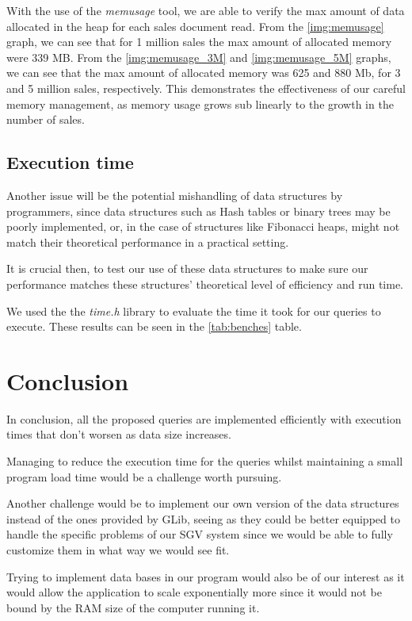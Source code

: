 \documentclass[a4paper]{report}
\begin{document}
With the use of the \textit{memusage} tool, we are able to verify the max amount of data allocated in the heap for each sales document read.
From the \ref{img:memusage} graph, we can see that for 1 million sales the max amount of allocated memory were 339 MB.
From the \ref{img:memusage_3M} and \ref{img:memusage_5M} graphs, we can see that the max amount of allocated memory was 625 and 880 Mb, for 3 and 5 million sales, respectively. This demonstrates the effectiveness of our careful memory management, as memory usage grows sub linearly to the growth in the number of sales.


\section{Execution time}

Another issue will be the potential mishandling of data structures by programmers, since data structures such as Hash tables or binary trees may be poorly implemented, or, in the case of structures like Fibonacci heaps, might not match their theoretical performance in a practical setting.

It is crucial then, to test our use of these data structures to make sure our performance matches these structures' theoretical level of efficiency and run time.

We used the the \textit{time.h} library to evaluate the time it took for our queries to execute. These results can be seen in the \ref{tab:benches} table.

\chapter{Conclusion}
In conclusion, all the proposed queries are implemented efficiently with execution times that don't  worsen as data size increases. 

Managing to reduce the execution time for the queries whilst maintaining a small program load time would be a challenge worth pursuing.

Another challenge would be to implement our own version of the data structures instead of the ones provided by GLib, seeing as they could be better equipped to handle the specific problems of our SGV system since we would be able to fully customize them in what way we would see fit.

Trying to implement data bases in our program would also be of our interest as it would allow the application to scale exponentially more since it would not be bound by the RAM size of the computer running it.
\end{document}

